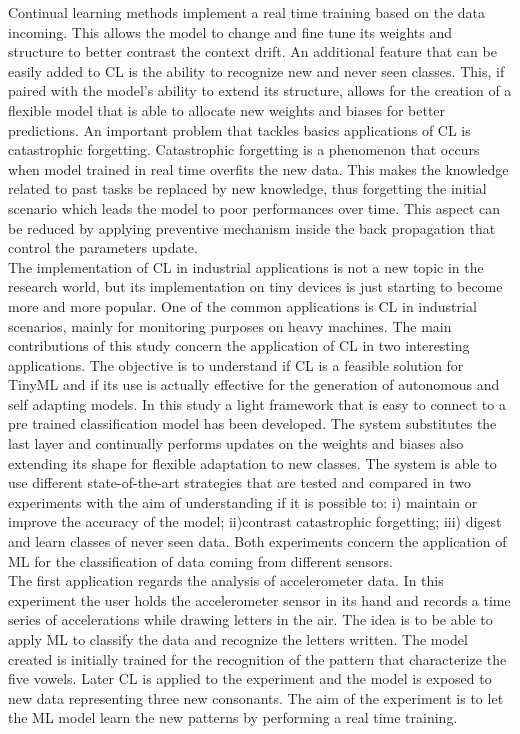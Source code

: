\documentclass[12pt]{report}
\begin{document}
Continual learning methods implement a real time training based on the data incoming. This allows the model to change and fine tune its weights and structure to better contrast the context drift. 
An additional feature that can be easily added to CL is the ability to recognize new and never seen classes. This, if paired with the model's ability to extend its structure, allows for the creation of a flexible model that is able to allocate new weights and biases for better predictions.  
An important problem that tackles basics applications of CL is catastrophic forgetting. Catastrophic forgetting is a phenomenon that occurs when model trained in real time overfits the new data. This makes the knowledge related to past tasks be replaced by new knowledge, thus forgetting the initial scenario which leads the model to poor performances over time. This aspect can be reduced by applying preventive mechanism inside the back propagation that control the parameters update. \\
The implementation of CL in industrial applications is not a new topic in the research world, but its implementation on tiny devices is just starting to become more and more popular. One of the common applications is CL in industrial scenarios, mainly for monitoring purposes on heavy machines.
The main contributions of this study concern the application of CL in two interesting applications. The objective is to understand if CL is a feasible solution for TinyML and if its use is actually effective for the generation of autonomous and self adapting models. In this study a light framework that is easy to connect to a pre trained classification model has been developed. The system substitutes the last layer and continually performs updates on the weights and biases also extending its shape for flexible adaptation to new classes. The system is able to use different state-of-the-art strategies that are tested and compared in two experiments with the aim of understanding if it is possible to: i) maintain or improve the accuracy of the model; ii)contrast catastrophic forgetting; iii) digest and learn classes of never seen data. Both experiments concern the application of ML for the classification of data coming from different sensors. \\
The first application regards the analysis of accelerometer data. In this experiment the user holds the accelerometer sensor in its hand and records a time series of accelerations while drawing letters in the air. The idea is to be able to apply ML to classify the data and recognize the letters written. The model created is initially trained for the recognition of the pattern that characterize the five vowels. Later CL is applied to the experiment and the model is exposed to new data representing three new consonants. The aim of the experiment is to let the ML model learn the new patterns by performing a real time training.
\end{document}
